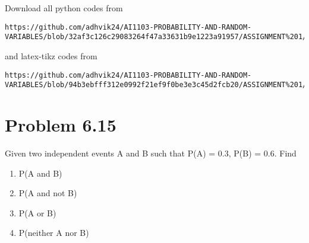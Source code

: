 \documentclass[journal,12pt,twocolumn]{IEEEtran}
\begin{document}
\maketitle
\newpage
\bigskip
\renewcommand{\thefigure}{\theenumi}
\renewcommand{\thetable}{\theenumi}
Download all python codes from 
\begin{lstlisting}
https://github.com/adhvik24/AI1103-PROBABILITY-AND-RANDOM-VARIABLES/blob/32af3c126c29083264f47a33631b9e1223a91957/ASSIGNMENT%201/codes/assign1.py
\end{lstlisting}
%
and latex-tikz codes from 
%
\begin{lstlisting}
https://github.com/adhvik24/AI1103-PROBABILITY-AND-RANDOM-VARIABLES/blob/94b3ebfff312e0992f21ef9f0be3e3c45d2fcb20/ASSIGNMENT%201/assign1.tex
\end{lstlisting}
\section{Problem 6.15}
Given two independent events A and B such
that P(A) = 0.3, P(B) = 0.6. Find
\begin{enumerate}[label={\roman*)}]
    \item P(A and B)
    \item P(A and not B)
    \item P(A or B)
    \item P(neither A nor B)
\end{enumerate}
\end{document}
